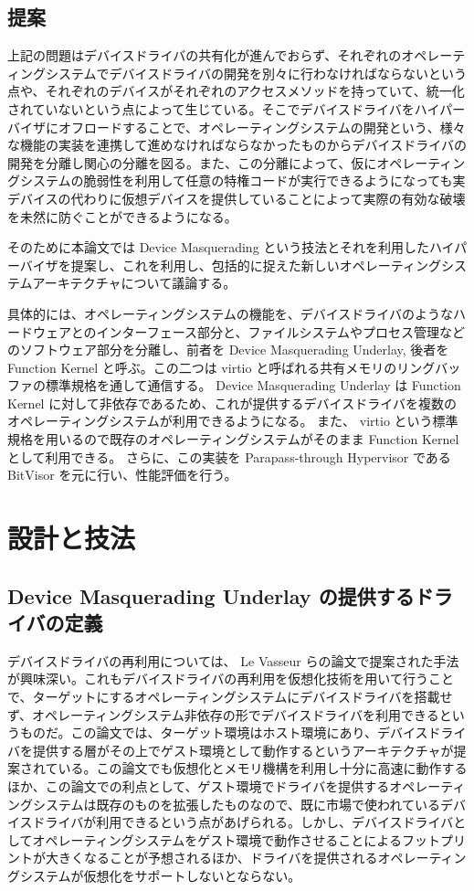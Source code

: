 \documentclass[a4paper,11pt,report]{ltjsbook}
\begin{document}
\section{提案}

上記の問題はデバイスドライバの共有化が進んでおらず、それぞれのオペレーティングシステムでデバイスドライバの開発を別々に行わなければならないという点や、それぞれのデバイスがそれぞれのアクセスメソッドを持っていて、統一化されていないという点によって生じている。そこでデバイスドライバをハイパーバイザにオフロードすることで、オペレーティングシステムの開発という、様々な機能の実装を連携して進めなければならなかったものからデバイスドライバの開発を分離し関心の分離を図る。また、この分離によって、仮にオペレーティングシステムの脆弱性を利用して任意の特権コードが実行できるようになっても実デバイスの代わりに仮想デバイスを提供していることによって実際の有効な破壊を未然に防ぐことができるようになる。

そのために本論文では Device Masquerading という技法とそれを利用したハイパーバイザを提案し、これを利用し、包括的に捉えた新しいオペレーティングシステムアーキテクチャについて議論する。

具体的には、オペレーティングシステムの機能を、デバイスドライバのようなハードウェアとのインターフェース部分と、ファイルシステムやプロセス管理などのソフトウェア部分を分離し、前者を Device Masquerading Underlay, 後者を Function Kernel と呼ぶ。この二つは virtio と呼ばれる共有メモリのリングバッファの標準規格を通して通信する。
Device Masquerading Underlay は Function Kernel に対して非依存であるため、これが提供するデバイスドライバを複数のオペレーティングシステムが利用できるようになる。
また、 virtio という標準規格を用いるので既存のオペレーティングシステムがそのまま Function Kernel として利用できる。
さらに、この実装を Parapass-through Hypervisor である BitVisor を元に行い、性能評価を行う。

\chapter{設計と技法}

\section{Device Masquerading Underlay の提供するドライバの定義}

デバイスドライバの再利用については、 Le Vasseur らの論文\cite{reuse}で提案された手法が興味深い。これもデバイスドライバの再利用を仮想化技術を用いて行うことで、ターゲットにするオペレーティングシステムにデバイスドライバを搭載せず、オペレーティングシステム非依存の形でデバイスドライバを利用できるというものだ。この論文では、ターゲット環境はホスト環境にあり、デバイスドライバを提供する層がその上でゲスト環境として動作するというアーキテクチャが提案されている。この論文でも仮想化とメモリ機構を利用し十分に高速に動作するほか、この論文での利点として、ゲスト環境でドライバを提供するオペレーティングシステムは既存のものを拡張したものなので、既に市場で使われているデバイスドライバが利用できるという点があげられる。しかし、デバイスドライバとしてオペレーティングシステムをゲスト環境で動作させることによるフットプリントが大きくなることが予想されるほか、ドライバを提供されるオペレーティングシステムが仮想化をサポートしないとならない。
\end{document}
